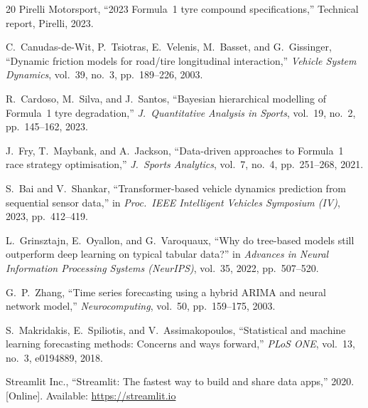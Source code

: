 \documentclass[journal,twoside]{IEEEtran}
\begin{document}
\begin{thebibliography}{20}
Pirelli Motorsport,
``2023 Formula~1 tyre compound specifications,''
Technical report, Pirelli, 2023.

C.~Canudas-de-Wit, P.~Tsiotras, E.~Velenis, M.~Basset, and
G.~Gissinger,
``Dynamic friction models for road/tire longitudinal interaction,''
\emph{Vehicle System Dynamics}, vol.~39, no.~3, pp.~189--226, 2003.

R.~Cardoso, M.~Silva, and J.~Santos,
``Bayesian hierarchical modelling of Formula~1 tyre degradation,''
\emph{J.\ Quantitative Analysis in Sports}, vol.~19, no.~2,
pp.~145--162, 2023.

J.~Fry, T.~Maybank, and A.~Jackson,
``Data-driven approaches to Formula~1 race strategy optimisation,''
\emph{J.\ Sports Analytics}, vol.~7, no.~4, pp.~251--268, 2021.

S.~Bai and V.~Shankar,
``Transformer-based vehicle dynamics prediction from sequential
sensor data,''
in \emph{Proc.\ IEEE Intelligent Vehicles Symposium (IV)}, 2023,
pp.~412--419.

L.~Grinsztajn, E.~Oyallon, and G.~Varoquaux,
``Why do tree-based models still outperform deep learning on typical
tabular data?''
in \emph{Advances in Neural Information Processing Systems (NeurIPS)},
vol.~35, 2022, pp.~507--520.

G.~P.~Zhang,
``Time series forecasting using a hybrid ARIMA and neural network
model,''
\emph{Neurocomputing}, vol.~50, pp.~159--175, 2003.

S.~Makridakis, E.~Spiliotis, and V.~Assimakopoulos,
``Statistical and machine learning forecasting methods: Concerns and
ways forward,''
\emph{PLoS ONE}, vol.~13, no.~3, e0194889, 2018.

Streamlit Inc.,
``Streamlit: The fastest way to build and share data apps,''
2020.
[Online]. Available: \url{https://streamlit.io}

\end{thebibliography}

\balance
\end{document}
